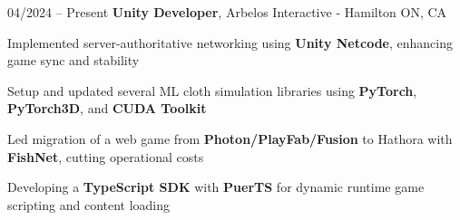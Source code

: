 \begin{twocolentry}{
    04/2024 – Present
}
\fontsize{11 pt}{11 pt}\textbf{Unity Developer}, Arbelos Interactive - Hamilton ON, CA \end{twocolentry}

\vspace{0.10 cm}
\begin{onecolentry}
   \begin{highlights}
       \item Implemented server-authoritative networking using \textbf{Unity Netcode}, enhancing game sync and stability
       \item Setup and updated several ML cloth simulation libraries using \textbf{PyTorch}, \textbf{PyTorch3D}, and \textbf{CUDA Toolkit}
       \item Led migration of a web game from \textbf{Photon/PlayFab/Fusion} to Hathora with \textbf{FishNet}, cutting operational costs
       \item Developing a \textbf{TypeScript SDK} with \textbf{PuerTS} for dynamic runtime game scripting and content loading
   \end{highlights}
\end{onecolentry}